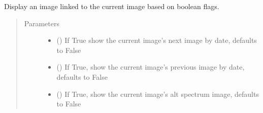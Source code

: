 \documentclass[letterpaper,10pt,english]{sphinxmanual}
\begin{document}
\begin{fulllineitems}
\begin{fulllineitems}
\begin{quote}
\begin{description}
\begin{itemize}
\end{itemize}

\end{description}\end{quote}

\end{fulllineitems}


\begin{fulllineitems}
\label{\detokenize{polo.widgets:polo.widgets.slideshow_inspector.slideshowInspector._set_alt_image}}
Display an image linked to the current image based on
boolean flags.
\begin{quote}\begin{description}
\item[{Parameters}] \leavevmode\begin{itemize}
\item {} 
 (\sphinxstyleliteralemphasis{\sphinxupquote{, }}) \textendash{} If True show the current image’s next
image by date, defaults to False

\item {} 
 (\sphinxstyleliteralemphasis{\sphinxupquote{, }}) \textendash{} If True, show the current image’s previous
image by date, defaults to False

\item {} 
 (\sphinxstyleliteralemphasis{\sphinxupquote{, }}) \textendash{} If True, show the current image’s alt
spectrum image, defaults to False

\end{itemize}


\end{description}
\end{quote}
\end{fulllineitems}
\end{fulllineitems}
\end{document}
